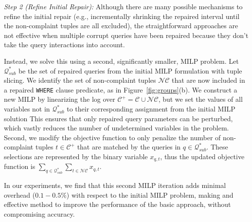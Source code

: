 \noindent\textit{Step 2 (Refine Initial Repair):}
Although there are many possible mechanisms to refine the initial repair (e.g., incrementally shrinking
the repaired interval until the non-complaint tuples are all excluded), 
the straightforward approaches are not effective when multiple corrupt 
queries have been repaired because they don't take the query interactions into account.

Instead, we solve this using a second, significantly smaller, MILP problem.   
Let $\mathcal{Q}^*_{sub}$ be the set of repaired queries from the  initial MILP formulation with tuple slicing.
We identify the set of non-complaint tuples $\mathcal{NC}$ that are now included in a repaired \texttt{WHERE} clause predicate, as in Figure~\ref{fig:groups}(b). We construct a new MILP by linearizing the log over $\mathcal{C}^+ = \mathcal{C} \cup \mathcal{NC}$, but we set the values of all variables not in $\mathcal{Q}^*_{sub}$ to their corresponding assignment from the initial MILP solution
This ensures that only repaired query parameters can
be perturbed, which vastly reduces the number of undetermined variables in the problem.
Second, we modify the objective function to only penalize the number of non-complaint tuples 
$t \in \mathcal{C}^+$ that are matched by the queries in $q \in \mathcal{Q}^*_{sub}$.
These selections are represented by the binary variable $x_{q, t}$, thus the updated objective function
is $\sum_{q \in \mathcal{Q}^*_{sub}} \sum_{t \in \mathcal{NC}} x_{q,t}$.

In our experiments, we find that this second MILP iteration adds
minimal overhead ($0.1-0.5\%$) with respect to the initial MILP
problem, making \tslice and effective method to improve the performance of the basic approach, without compromising accuracy.



